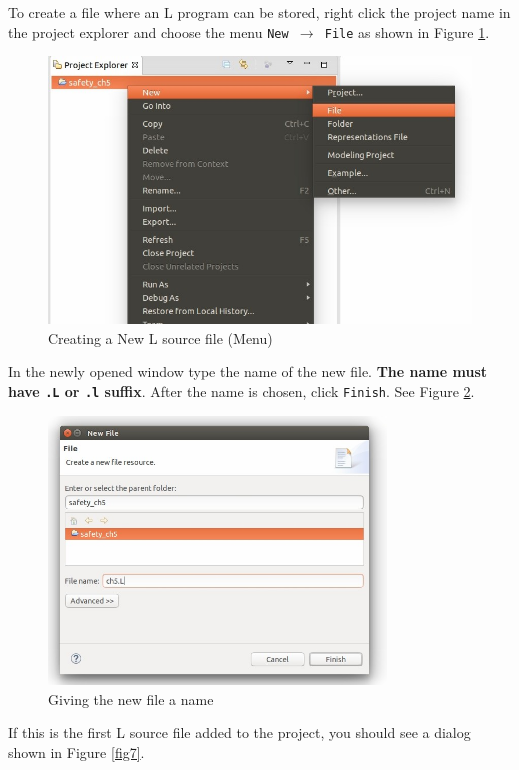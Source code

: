 \documentclass[a4paper,10pt]{article}
\begin{document}
To create a file where an L program can be stored, right click  the project name in the project explorer and choose the menu \texttt{New $\to$ File} as shown in Figure \ref{fig5}.

\begin{figure}[h!]
\centering
\includegraphics[width=1.0\textwidth]{5}
\caption{Creating a New L source file (Menu)}\label{fig5}
\end{figure}

\noindent
In the newly opened window type the name of the new file. \textbf{The name must have \texttt{.L} or \texttt{.l} suffix}. After the name is chosen, click  \texttt{Finish}. See Figure \ref{fig6}.

\begin{figure}[h!]
\centering
\includegraphics[width=0.8\textwidth]{6}
\caption{Giving the new file a name}\label{fig6}
\end{figure}

\noindent
If this is the first L source file added to the project, you should see a dialog shown in Figure \ref{fig7}.
 
\end{document}
